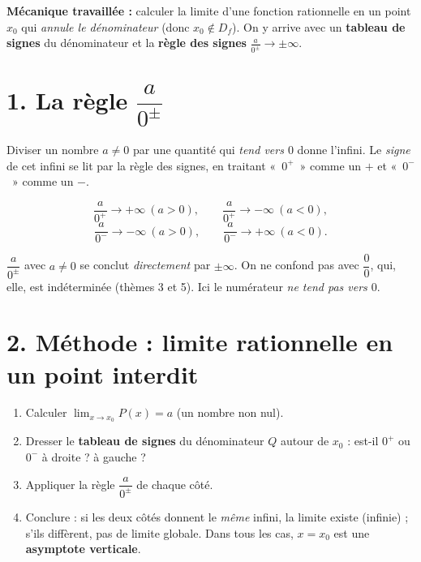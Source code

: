 \documentclass[11pt,a4paper]{article}
\begin{document}
\begin{tcolorbox}[boxbase,colback=primary!12,colframe=primary,
   title={\Large Thème 2 — La règle $\dfrac{a}{0^{\pm}}$ et l'asymptote verticale}]
\textbf{Mécanique travaillée :} calculer la limite d'une fonction rationnelle en un point $x_0$ qui
\emph{annule le dénominateur} (donc $x_0\notin D_f$). On y arrive avec un \textbf{tableau de signes}
du dénominateur et la \textbf{règle des signes} $\frac{a}{0^{\pm}}\to\pm\infty$.
\end{tcolorbox}

\section{1. La règle $\dfrac{a}{0^{\pm}}$}

Diviser un nombre $a\neq 0$ par une quantité qui \emph{tend vers $0$} donne l'infini. Le \emph{signe}
de cet infini se lit par la règle des signes, en traitant «~$0^{+}$~» comme un $+$ et «~$0^{-}$~»
comme un $-$.

\begin{idee}
\[ \frac{a}{0^{+}}\to +\infty\ (a>0),\qquad \frac{a}{0^{+}}\to -\infty\ (a<0), \]
\[ \frac{a}{0^{-}}\to -\infty\ (a>0),\qquad \frac{a}{0^{-}}\to +\infty\ (a<0). \]
\end{idee}

\begin{attention}
$\dfrac{a}{0^{\pm}}$ avec $a\neq 0$ se conclut \emph{directement} par $\pm\infty$. On ne confond pas
avec $\dfrac{0}{0}$, qui, elle, est indéterminée (thèmes 3 et 5). Ici le numérateur \emph{ne tend
pas vers $0$}.
\end{attention}

\section{2. Méthode : limite rationnelle en un point interdit}

\begin{methode}[limite de $\frac{P(x)}{Q(x)}$ en $x_0$ avec $Q(x_0)=0$ et $P(x_0)\neq 0$]
\begin{enumerate}[leftmargin=1.9em,topsep=2pt,itemsep=2pt]
  \item Calculer $\displaystyle\lim_{x\to x_0} P(x)=a$ (un nombre non nul).
  \item Dresser le \textbf{tableau de signes} du dénominateur $Q$ autour de $x_0$ : est-il $0^{+}$ ou
        $0^{-}$ à droite ? à gauche ?
  \item Appliquer la règle $\dfrac{a}{0^{\pm}}$ de chaque côté.
  \item Conclure : si les deux côtés donnent le \emph{même} infini, la limite existe (infinie) ; s'ils
        diffèrent, pas de limite globale. Dans tous les cas, $x=x_0$ est une \textbf{asymptote verticale}.
\end{enumerate}
\end{methode}
\end{document}
